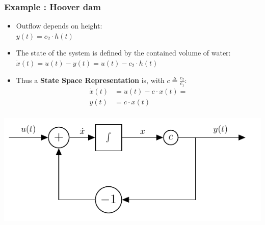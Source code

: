 \begin{frame}
\end{frame}

\begin{frame}
	\frametitle{Example : Hoover dam}
	\begin{itemize}
		\item Outflow depends on height: \\
			\hspace{1cm}$y(t) = c_2 \cdot h(t) $
		\item The state of the system is defined by the contained volume of water: \\
			\hspace{1cm}$\dot{x}(t) = u(t) - y(t) = u(t) - c_2\cdot h(t) $
		\item Thus a \textbf{State Space Representation} is, with $c \triangleq \frac{c_2}{c_1}$:
			\begin{align*}
				\dot{x}(t) &= u(t) - c\cdot x(t) =	\\
				y(t) &= c\cdot x(t) \\
			\end{align*} 
	\end{itemize}
	\vspace{-1cm}
	\begin{center}
		\includegraphics[width=0.6\linewidth]{img/hoover-block-diagram}
	\end{center}	
\end{frame}
